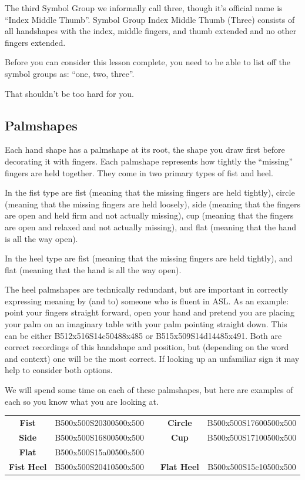 \documentclass{article}
\begin{document}
The third Symbol Group we informally call three, though it's official name is ``Index Middle Thumb''.
Symbol Group Index Middle Thumb (Three) consists of all handshapes with the index, middle fingers, and thumb extended and no other fingers extended.

Before you can consider this lesson complete, you need to be able to list off the symbol groups as:
``one, two, three''.

That shouldn't be too hard for you.

\subsection{Palmshapes}

Each hand shape has a palmshape at its root, the shape you draw first before decorating it with fingers.
Each palmshape represents how tightly the ``missing'' fingers are held together.
They come in two primary types of fist and heel.

In the fist type are fist (meaning that the missing fingers are held tightly),
circle (meaning that the missing fingers are held loosely),
side (meaning that the fingers are open and held firm and not actually missing),
cup (meaning that the fingers are open and relaxed and not actually missing), and
flat (meaning that the hand is all the way open).

In the heel type are fist (meaning that the missing fingers are held tightly),
and flat (meaning that the hand is all the way open).

The heel palmshapes are technically redundant, but are important in correctly expressing meaning by (and to) someone who is fluent in ASL.
As an example: point your fingers straight forward, open your hand and pretend you are placing your palm on an imaginary table with your palm pointing straight down.
This can be either B512x516S14c50488x485 or B515x509S14d14485x491.
Both are correct recordings of this handshape and position, but (depending on the word and context) one will be the most correct.
If looking up an unfamiliar sign it may help to consider both options.

We will spend some time on each of these palmshapes, but here are examples of each so you know what you are looking at.

\begin{center}
\begin{tabular}{ccccc}
\textbf{Fist}     &B500x500S20300500x500&&\textbf{Circle}   &B500x500S17600500x500\\
\textbf{Side}     &B500x500S16800500x500&&\textbf{Cup}      &B500x500S17100500x500\\
\textbf{Flat}     &B500x500S15a00500x500\\
\textbf{Fist Heel}&B500x500S20410500x500&&\textbf{Flat Heel}&B500x500S15c10500x500\\
\end{tabular}
\end{center}
\end{document}
